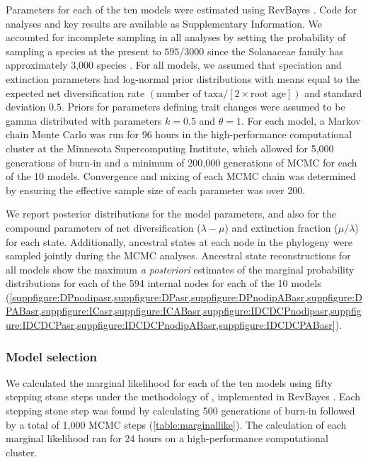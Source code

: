 Parameters for each of the ten models were estimated using RevBayes \citep{hoehna_2016}.
Code for analyses and key results are available as Supplementary Information. %
We accounted for incomplete sampling in all analyses by setting the probability of sampling a species at the present to $595/3000$ \citep[using the method of][]{fitzjohn_2009} since the Solanaceae family has approximately 3,000 species \citep{solsource}.
For all models, we assumed that speciation and extinction parameters had log-normal prior distributions with means equal to the expected net diversification rate $(\text{number of taxa} / [2 \times \text{root age}])$ and standard deviation $0.5$.
Priors for parameters defining trait changes were assumed to be gamma distributed with parameters $k=0.5$ and $\theta=1$. 
For each model, a Markov chain Monte Carlo \citep[MCMC;][]{metropolis1953equation,Hastings1970} was run for 96 hours in the high-performance computational cluster at the Minnesota Supercomputing Institute, which allowed for 5,000 generations of burn-in and a minimum of 200,000 generations of MCMC for each of the 10 models. %
Convergence and mixing of each MCMC chain was determined by ensuring the effective sample size of each parameter was over 200.

We report posterior distributions for the model parameters, and also for the compound parameters of net diversification ($\lambda - \mu$) and extinction fraction ($\mu / \lambda$) for each state.
Additionally, ancestral states at each node in the phylogeny were sampled jointly during the MCMC analyses.
Ancestral state reconstructions for all models show the maximum \emph{a posteriori} estimates of the marginal probability distributions for each of the 594 internal nodes for each of the 10 models (\cref{suppfigure:DPnodipasr,suppfigure:DPasr,suppfigure:DPnodipABasr,suppfigure:DPABasr,suppfigure:ICasr,suppfigure:ICABasr,suppfigure:IDCDCPnodipasr,suppfigure:IDCDCPasr,suppfigure:IDCDCPnodipABasr,suppfigure:IDCDCPABasr}). %

\subsubsection{Model selection}

We calculated the marginal likelihood for each of the ten models using fifty stepping stone steps under the methodology of \citet{xie_2010}, implemented in RevBayes \citep{hoehna_2016}.
Each stepping stone step was found by calculating 500 generations of burn-in followed by a total of 1,000 MCMC steps (\cref{table:marginallike}).
The calculation of each marginal likelihood ran for 24 hours on a high-performance computational cluster. %

